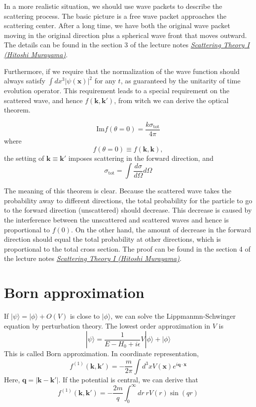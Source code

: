 \documentclass[cyan]{elegantnote}
\begin{document}
In a more realistic situation, we should use wave packets to describe the scattering process. The basic picture is a free wave packet approaches the scattering center. After a long time, we have both the original wave packet moving in the original direction plus a spherical wave front that moves outward. The details can be found in the section 3 of the lecture notes 
\href{http://hitoshi.berkeley.edu/221B/index.html}{\emph{Scattering Theory I (Hitoshi Murayama)}}.

Furthermore, if we require that the normalization of the wave function should always satisfy $\int dx^3 |\psi(\mathbf{x})|^2$ for any $t$, as guaranteed by the unitarity of time evolution operator. This requirement leads to a special requirement on the scattered wave, and hence $f(\mathbf{k},\mathbf{k}')$, from witch we can derive the optical theorem.

\begin{newthem}
\[\mathrm{Im} f(\theta = 0) = \frac{k\sigma_{\mathrm{tot}}}{4\pi}\]
where
\[f(\theta = 0) \equiv f(\mathbf{k},\mathbf{k}),\]
the setting of $\mathbf{k} \equiv \mathbf{k}'$ imposes scattering in the forward direction, and
\[\sigma_{\mathrm{tot}} = \int \frac{d\sigma}{d\Omega} d\Omega\]
\end{newthem}
The meaning of this theorem is clear. Because the scattered wave takes the probability away to different directions, the total probability for the particle to go to the forward direction (unscattered) should decrease. This decrease is caused by the interference between the unscattered and scattered waves and hence is proportional to $f(0)$. On the other hand, the amount of decrease in the forward direction should equal the total probability at other directions, which is proportional to the total cross section. The proof can be found in the section 4 of the lecture notes \href{http://hitoshi.berkeley.edu/221B/index.html}{\emph{Scattering Theory I (Hitoshi Murayama)}}.

\section{Born approximation}
If $|\psi\rangle = |\phi\rangle + O(V)$ is close to $|\phi\rangle$, we can solve the Lippmanmn-Schwinger equation by perturbation theory. The lowest order approximation in $V$ is
\[|\psi\rangle = \frac{1}{E-H_0 + i\epsilon} V|\phi\rangle + |\phi\rangle\]
This is called Born approximation. In coordinate representation,
\[f^{(1)}(\mathbf{k},\mathbf{k}') = - \frac{m}{2\pi} \int d^3x V(\mathbf{x}) e^{i\mathbf{q}\cdot\mathbf{x}}\]
Here, $\mathbf{q} = |\mathbf{k} - \mathbf{k}'|$. If the potential is central, we can derive that
\[f^{(1)}(\mathbf{k},\mathbf{k}') = - \frac{2m}{q} \int_0^{\infty} dr \: r V(r) \sin(qr)\]
\end{document}
